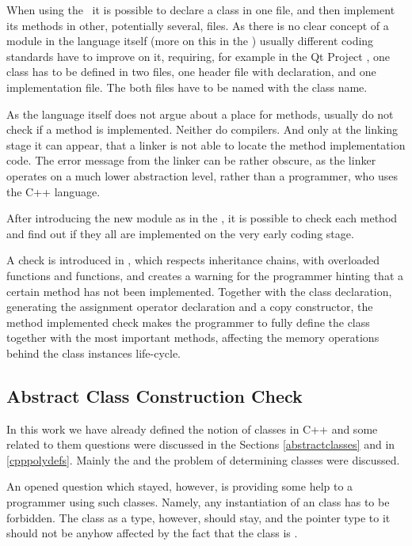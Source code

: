 When using the \cpppl\ it is possible to declare a class in one file, and then implement its methods in other, potentially
several, files. As there is no clear concept of a module in the language itself (more on this in the ) usually 
different coding standards have to improve on it, requiring, for example in the Qt Project \cite{qtcodingguide}, one class
has to be defined in two files, one header file with declaration, and one implementation file. The both files have to be
named with the class name.

As the language itself does not argue about a place for methods,  usually do not check if a method is implemented.
Neither do compilers. And only at the linking stage it can appear, that a linker is not able to locate the method implementation code. The error
message from the linker can be rather obscure, as the linker operates on a much lower abstraction level, rather than a programmer, who
uses the C++ language. 

After introducing the new module  as in the , it is possible to check each method and find out if they all 
are implemented on the very early coding stage.

A check is introduced in \pcpp, which respects inheritance chains, with overloaded functions and  functions,
and creates a warning for the programmer hinting that a certain method has not been implemented. Together with the class declaration, 
generating the assignment operator declaration and a copy constructor, the method implemented check makes the programmer to 
fully define the class together with the most important methods, affecting the memory operations behind the class instances life-cycle.


\subsection{Abstract Class Construction Check}
\label{preventiveabstract}

In this work we have already defined the notion of  classes in C++ and some related to them questions were discussed 
in the Sections \ref{abstractclasses} and
in \ref{cpppolydefs}. Mainly the  and the problem of determining  classes were discussed.



An opened question which stayed, however, is providing some help to a programmer using such classes. Namely, any instantiation
of an  class has to be forbidden. The  class as a type, however, should stay, and the pointer type to it should not
be anyhow affected by the fact that the class is .

